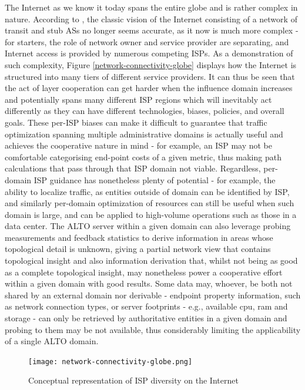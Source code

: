     The Internet as we know it today spans the entire globe and is rather complex in nature.
    According to \cite{dan-Commag10}, the classic vision of the Internet consisting of a network of transit and stub ASs no longer seems accurate, as it now is much more complex - for starters, the role of network owner and service provider are separating, and Internet access is provided by numerous competing ISPs.
    As a demonstration of such complexity, Figure \ref{network-connectivity-globe} displays how the Internet is structured into many tiers of different service providers.
    It can thus be seen that the act of layer cooperation can get harder when the influence domain increases and potentially spans many different ISP regions which will inevitably act differently as they can have different technologies, biases, policies, and overall goals.
    These per-ISP biases can make it difficult to guarantee that traffic optimization spanning multiple administrative domains is actually useful and achieves the cooperative nature in mind - for example, an ISP may not be comfortable categorising end-point costs of a given metric, thus making path calculations that pass through that ISP domain not viable.
    Regardless, per-domain ISP guidance has nonetheless plenty of potential - for example, the ability to localize traffic, as entities outside of domain can be identified by ISP, and similarly per-domain optimization of resources can still be useful when such domain is large, and can be applied to high-volume operations such as those in a data center.
    The ALTO server within a given domain can also leverage probing measurements and feedback statistics to derive information in areas whose topological detail is unknown, giving a partial network view that contains topological insight and also information derivation that, whilst not being as good as a complete topological insight, may nonetheless power a cooperative effort within a given domain with good results.
    Some data may, whoever, be both not shared by an external domain nor derivable - endpoint property information, such as network connection types, or server footprints - e.g., available cpu, ram and storage - can only be retrieved by authoritative entities in a given domain and probing to them may be not available, thus considerably limiting the applicability of a single ALTO domain.

    \begin{figure}[!t]
    \centering
    \texttt{[image: network-connectivity-globe.png]}
    \caption{Conceptual representation of ISP diversity on the Internet }
    \label{fig:network-connectivity-globe}
    \end{figure}

